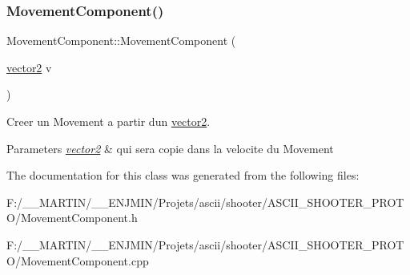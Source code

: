 \subsubsection{\texorpdfstring{Movement\+Component()}{MovementComponent()}\hspace{0.1cm}{\footnotesize\ttfamily [2/2]}}
{\footnotesize\ttfamily Movement\+Component\+::\+Movement\+Component (\begin{DoxyParamCaption}\item[{\hyperlink{structvector2}{vector2}}]{v }\end{DoxyParamCaption})\hspace{0.3cm}{\ttfamily [inline]}}



Creer un Movement a partir d\textquotesingle{}un \hyperlink{structvector2}{vector2}. 


\begin{DoxyParams}{Parameters}
{\em \hyperlink{structvector2}{vector2}} & qui sera copie dans la velocite du Movement \\
\hline
\end{DoxyParams}


The documentation for this class was generated from the following files\+:\begin{DoxyCompactItemize}
\item 
F\+:/\+\_\+\+\_\+\+M\+A\+R\+T\+I\+N/\+\_\+\+\_\+\+E\+N\+J\+M\+I\+N/\+Projets/ascii/shooter/\+A\+S\+C\+I\+I\+\_\+\+S\+H\+O\+O\+T\+E\+R\+\_\+\+P\+R\+O\+T\+O/Movement\+Component.\+h\item 
F\+:/\+\_\+\+\_\+\+M\+A\+R\+T\+I\+N/\+\_\+\+\_\+\+E\+N\+J\+M\+I\+N/\+Projets/ascii/shooter/\+A\+S\+C\+I\+I\+\_\+\+S\+H\+O\+O\+T\+E\+R\+\_\+\+P\+R\+O\+T\+O/Movement\+Component.\+cpp\end{DoxyCompactItemize}
